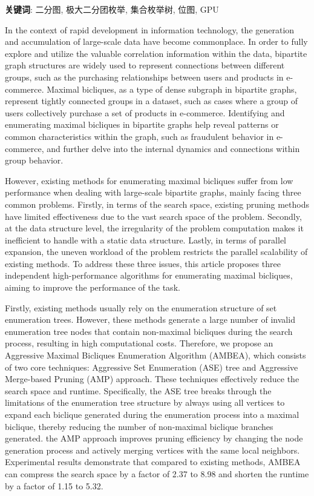 \vspace{\baselineskip}

\noindent \textbf{关键词}: 二分图, 极大二分团枚举, 集合枚举树, 位图, GPU

\cleardoublepage
{}

In the context of rapid development in information technology, the generation and accumulation of large-scale data have become commonplace. In order to fully explore and utilize the valuable correlation information within the data, bipartite graph structures are widely used to represent connections between different groups, such as the purchasing relationships between users and products in e-commerce. Maximal bicliques, as a type of dense subgraph in bipartite graphs, represent tightly connected groups in a dataset, such as cases where a group of users collectively purchase a set of products in e-commerce. Identifying and enumerating maximal bicliques in bipartite graphs help reveal patterns or common characteristics within the graph, such as fraudulent behavior in e-commerce, and further delve into the internal dynamics and connections within group behavior.

However, existing methods for enumerating maximal bicliques suffer from low performance when dealing with large-scale bipartite graphs, mainly facing three common problems. Firstly, in terms of the search space, existing pruning methods have limited effectiveness due to the vast search space of the problem. Secondly, at the data structure level, the irregularity of the problem computation makes it inefficient to handle with a static data structure. Lastly, in terms of parallel expansion, the uneven workload of the problem restricts the parallel scalability of existing methods. To address these three issues, this article proposes three independent high-performance algorithms for enumerating maximal bicliques, aiming to improve the performance of the task.

Firstly, existing methods usually rely on the enumeration structure of set enumeration trees. However, these methods generate a large number of invalid enumeration tree nodes that contain non-maximal bicliques during the search process, resulting in high computational costs. Therefore, we propose an Aggressive Maximal Bicliques Enumeration Algorithm (AMBEA), which consists of two core techniques: Aggressive Set Enumeration (ASE) tree and Aggressive Merge-based Pruning (AMP) approach. These techniques effectively reduce the search space and runtime. Specifically, the ASE tree breaks through the limitations of the enumeration tree structure by always using all vertices to expand each biclique generated during the enumeration process into a maximal biclique, thereby reducing the number of non-maximal biclique branches generated. the AMP approach improves pruning efficiency by changing the node generation process and actively merging vertices with the same local neighbors. Experimental results demonstrate that compared to existing methods, AMBEA can compress the search space by a factor of 2.37 to 8.98 and shorten the runtime by a factor of 1.15 to 5.32.

